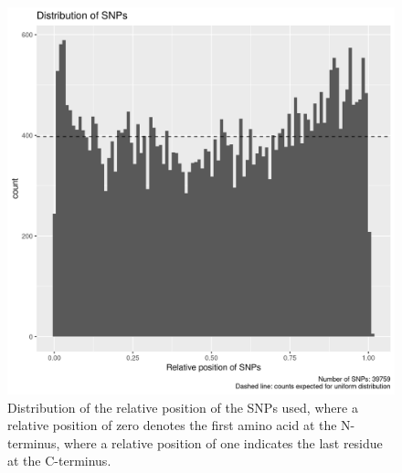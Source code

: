 \begin{figure}[!htbp]
  \includegraphics[width=\textwidth]{ncbi_peregrine_results/fig_snp_rel_pos.png}
  \caption{
    Distribution of the relative position of the SNPs used,
    where a relative position of zero denotes the first amino
    acid at the N-terminus, where a relative position of one
    indicates the last residue at the C-terminus.
  }
  \label{fig:snp_rel_pos}
\end{figure}

%
%





